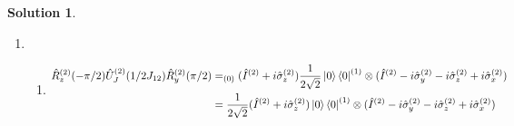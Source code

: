 \documentclass[10pt]{article}
\theoremstyle{definition}
\newtheorem{soln}{Solution}
\begin{document}
\begin{soln}
\begin{enumerate}[label=(\alph*)]
\begin{enumerate}[label=(\arabic*)]
\begin{align*}
                    \ket{1}\bra{1}^{(1)}e^{i(\pi/4)\hat{\sigma}_z^{(2)}}\hat{R}_y^{(2)}(\pi/2) & =\frac{1}{2}\ket{1}\bra{1}^{(1)}\otimes(\hat{I}^{(2)}+i\hat{\sigma}_z^{(2)})(\hat{I}^{(2)}-i\hat{\sigma}_y^{(2)})                                                                  \\
                                                                                               & =\frac{1}{2}\ket{1}\bra{1}^{(1)}\otimes(\hat{I}^{(2)}+i\hat{\sigma}_z^{(2)})(\hat{I}^{(2)}-i\hat{\sigma}_y^{(2)})                                                                  \\
                                                                                               & =\frac{1}{2}\ket{1}\bra{1}^{(1)}\otimes(\hat{I}^{(2)}(\hat{I}^{(2)}-i\hat{\sigma}_y^{(2)})+i\hat{\sigma}_z^{(2)}(\hat{I}^{(2)}-i\hat{\sigma}_y^{(2)}))                             \\
                                                                                               & =\frac{1}{2}\ket{1}\bra{1}^{(1)}\otimes(\hat{I}^{(2)}\hat{I}^{(2)}-i\hat{I}^{(2)}\hat{\sigma}_y^{(2)}+i\hat{\sigma}_z^{(2)}\hat{I}^{(2)}+\hat{\sigma}_z^{(2)}\hat{\sigma}_y^{(2)}) \\
                                                                                               & =\frac{1}{2}\ket{1}\bra{1}^{(1)}\otimes(\hat{I}^{(2)}-i\hat{\sigma}_y^{(2)}+i\hat{\sigma}_z^{(2)}-i\hat{\sigma}_x^{(2)})                                                           \\
                  \end{align*}
          \end{enumerate}
    \item ~\begin{enumerate}[label=(\arabic*)]
            \item \begin{align*}
                    \hat{R}_z^{(2)}(-\pi/2)\hat{U}_J^{(2)}(1/2J_{12})\hat{R}_y^{(2)}(\pi/2) & =_{(0)} (\hat{I}^{(2)}+i\hat{\sigma}_z^{(2)})\frac{1}{2\sqrt{2}}\ket{0}\bra{0}^{(1)}\otimes(\hat{I}^{(2)}-i\hat{\sigma}_y^{(2)}-i\hat{\sigma}_z^{(2)}+i\hat{\sigma}_x^{(2)}) \\
                                                                                            & = \frac{1}{2\sqrt{2}}(\hat{I}^{(2)}+i\hat{\sigma}_z^{(2)})\ket{0}\bra{0}^{(1)}\otimes(\hat{I}^{(2)}-i\hat{\sigma}_y^{(2)}-i\hat{\sigma}_z^{(2)}+i\hat{\sigma}_x^{(2)})       \\
                  \end{align*}

\end{enumerate}
\end{enumerate}
\end{soln}
\end{document}
